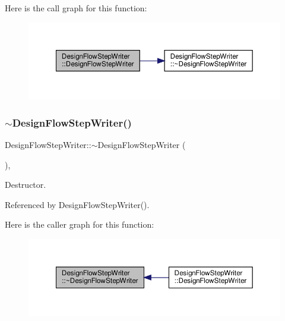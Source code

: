 Here is the call graph for this function\+:
\nopagebreak
\begin{figure}[H]
\begin{center}
\leavevmode
\includegraphics[width=350pt]{de/d2c/classDesignFlowStepWriter_a294213703960582d00bfde4210650605_cgraph}
\end{center}
\end{figure}
\mbox{\label{classDesignFlowStepWriter_a0eb543f9955460c35494103145c8080f}} 
\subsubsection{\texorpdfstring{$\sim$\+Design\+Flow\+Step\+Writer()}{~DesignFlowStepWriter()}}
{\footnotesize\ttfamily Design\+Flow\+Step\+Writer\+::$\sim$\+Design\+Flow\+Step\+Writer (\begin{DoxyParamCaption}{ }\end{DoxyParamCaption})\hspace{0.3cm}{\ttfamily [override]}, {\ttfamily [default]}}



Destructor. 



Referenced by Design\+Flow\+Step\+Writer().

Here is the caller graph for this function\+:
\nopagebreak
\begin{figure}[H]
\begin{center}
\leavevmode
\includegraphics[width=350pt]{de/d2c/classDesignFlowStepWriter_a0eb543f9955460c35494103145c8080f_icgraph}
\end{center}
\end{figure}


